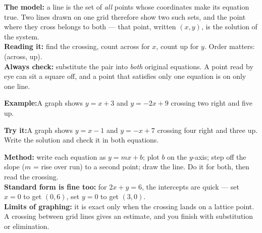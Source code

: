\documentclass[12pt]{article}
\begin{document}


\begin{formulabox}
\textbf{The model:} a line is the set of \emph{all} points whose coordinates make
its equation true. Two lines drawn on one grid therefore show two such sets, and
the point where they cross belongs to both --- that point, written $(x, y)$, is
the solution of the system.\\[3pt]
\textbf{Reading it:} find the crossing, count across for $x$, count up for $y$.
Order matters: (across, up).\\[3pt]
\textbf{Always check:} substitute the pair into \emph{both} original equations. A
point read by eye can sit a square off, and a point that satisfies only one
equation is on only one line.
\end{formulabox}

\begin{examplebox}
\textbf{Example:}\quad A graph shows $y = x + 3$ and $y = -2x + 9$ crossing two right and five up.
\end{examplebox}

\begin{tryitbox}
\textbf{Try it:}\quad A graph shows $y = x - 1$ and $y = -x + 7$ crossing four
right and three up. Write the solution and check it in both equations.\\[2pt]
\end{tryitbox}


\begin{formulabox}
\textbf{Method:} write each equation as $y = mx + b$; plot $b$ on the $y$-axis;
step off the slope ($m$ = rise over run) to a second point; draw the line. Do it
for both, then read the crossing.\\[3pt]
\textbf{Standard form is fine too:} for $2x + y = 6$, the intercepts are quick ---
set $x = 0$ to get $(0, 6)$, set $y = 0$ to get $(3, 0)$.\\[3pt]
\textbf{Limits of graphing:} it is exact only when the crossing lands on a lattice
point. A crossing between grid lines gives an estimate, and you finish with
substitution or elimination.
\end{formulabox}
\end{document}
